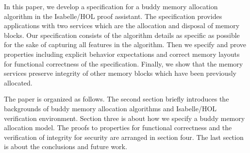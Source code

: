In this paper, we develop a specification for a buddy memory allocation algorithm in the Isabelle/HOL proof assistant. The specification provides applications with two services which are the allocation and disposal of memory blocks. Our specification consists of the algorithm details as specific as possible for the sake of capturing all features in the algorithm. Then we specify and prove properties including explicit behavior expectations and correct memory layouts for functional correctness of the specification. Finally, we show that the memory services preserve integrity of other memory blocks which have been previously allocated.

The paper is organized as follows. The second section briefly introduces the backgrounds of buddy memory allocation algorithms and Isabelle/HOL verification environment. Section three is about how we specify a buddy memory allocation model. The proofs to properties for functional correctness and the verification of integrity for security are arranged in section four. The last section is about the conclusions and future work.
